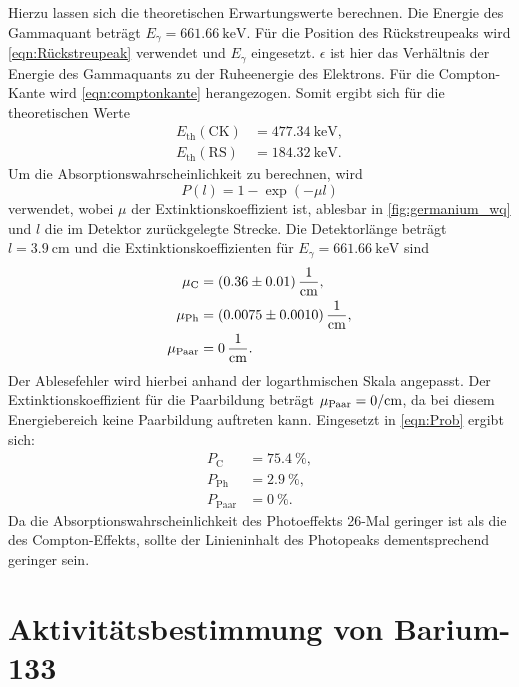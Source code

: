 Hierzu lassen sich die theoretischen Erwartungswerte berechnen. Die Energie des Gammaquant beträgt $E_{\gamma} = \qty{661.66}{\kilo\electronvolt}$. Für die Position des
Rückstreupeaks wird \autoref{eqn:Rückstreupeak} verwendet und $E_{\gamma}$ eingesetzt. $\epsilon$ ist hier das Verhältnis der Energie des Gammaquants zu der Ruheenergie des
Elektrons. Für die Compton-Kante wird \autoref{eqn:comptonkante} herangezogen. Somit ergibt sich für die theoretischen Werte 
\begin{align}
    E_{\mathrm{th}}(\mathrm{CK}) &= \qty{477.34}{\kilo\electronvolt},\\
    E_{\mathrm{th}}(\mathrm{RS}) &= \qty{184.32}{\kilo\electronvolt}.    
\end{align}
Um die Absorptionswahrscheinlichkeit zu berechnen, wird
\begin{equation}
    \label{eqn:Prob}
    P(l) = 1-\exp{(-\mu l)}
\end{equation}
verwendet, wobei $\mu$ der Extinktionskoeffizient ist, ablesbar in \autoref{fig:germanium_wq} und $l$ die im Detektor zurückgelegte Strecke. Die Detektorlänge beträgt $l = \qty{3.9}{\centi\metre}$
und die Extinktionskoeffizienten für $E_{\gamma} = \qty{661.66}{\kilo\electronvolt}$ sind 
\begin{align}
    \mu_{\mathrm{C}} &= \qty{0.36 \pm 0.01}{\per\centi\metre},\\
    \mu_{\mathrm{Ph}} &= \qty{0.0075 \pm 0.001}{\per\centi\metre},\\
    \mu_{\mathrm{Paar}} &= \qty{0 \pm 0}{\per\centi\metre}.
\end{align}
Der Ablesefehler wird hierbei anhand der logarthmischen Skala angepasst. Der Extinktionskoeffizient für die Paarbildung beträgt $\mu_{\mathrm{Paar}} = \qty{0 \pm 0}{\per\centi\metre}$, 
da bei diesem Energiebereich keine Paarbildung auftreten kann. Eingesetzt in \autoref{eqn:Prob} ergibt sich:
\begin{align}
    P_{\mathrm{C}} &= \qty{75.4}{\%},\\
    P_{\mathrm{Ph}} &= \qty{2.9}{\%},\\
    P_{\mathrm{Paar}} &= \qty{0}{\%}.
\end{align}
Da die Absorptionswahrscheinlichkeit des Photoeffekts 26-Mal geringer ist als die des Compton-Effekts, sollte der Linieninhalt des Photopeaks dementsprechend geringer sein.

\section{Aktivitätsbestimmung von Barium-133}

